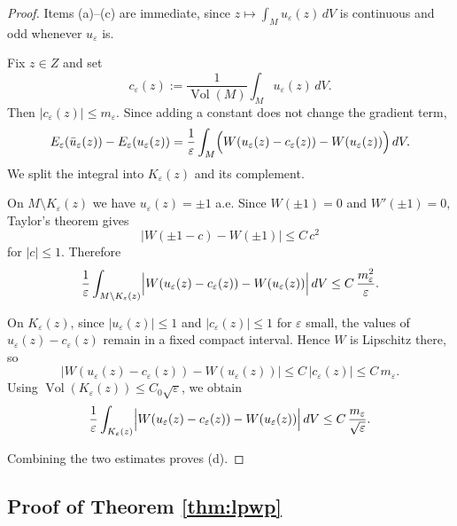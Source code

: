 \documentclass[12pt,english]{article}
\theoremstyle{definition}
\begin{document}
\begin{proof}
Items (a)--(c) are immediate, since $z\mapsto \int_M u_\varepsilon(z)\,dV$
is continuous and odd whenever $u_\varepsilon$ is.

Fix $z\in Z$ and set
\[
c_\varepsilon(z):=\frac{1}{\operatorname{Vol}(M)}\int_M u_\varepsilon(z)\,dV.
\]
Then $|c_\varepsilon(z)|\le m_\varepsilon.$ Since adding a constant does not change the gradient term,
\[
E_\varepsilon(\bar u_\varepsilon(z))-E_\varepsilon(u_\varepsilon(z))
=
\frac1\varepsilon\int_M
\Bigl(W(u_\varepsilon(z)-c_\varepsilon(z))-W(u_\varepsilon(z))\Bigr)\,dV.
\]
We split the integral into $K_\varepsilon(z)$ and its complement.

On $M\setminus K_\varepsilon(z)$ we have $u_\varepsilon(z)=\pm1$ a.e. Since $ W(\pm1)=0$ and $W'(\pm1)=0$, Taylor's theorem gives
\[
|W(\pm1-c)-W(\pm1)|\le C\,c^2
\]
for $|c|\le 1$. Therefore
\[
\frac1\varepsilon\int_{M\setminus K_\varepsilon(z)}
\Bigl|W(u_\varepsilon(z)-c_\varepsilon(z))-W(u_\varepsilon(z))\Bigr|\,dV
\le C\,\frac{m_\varepsilon^2}{\varepsilon}.
\]

On $K_\varepsilon(z)$, since $|u_\varepsilon(z)|\le 1$ and $|c_\varepsilon(z)|\le 1$ for $\varepsilon$ small,
the values of $u_\varepsilon(z)-c_\varepsilon(z)$ remain in a fixed compact interval. Hence $W$ is
Lipschitz there, so
\[
|W(u_\varepsilon(z)-c_\varepsilon(z))-W(u_\varepsilon(z))|
\le C\,|c_\varepsilon(z)|
\le C\,m_\varepsilon.
\]
Using $\operatorname{Vol}(K_\varepsilon(z))\le C_0\sqrt{\varepsilon}$, we obtain
\[
\frac1\varepsilon\int_{K_\varepsilon(z)}
\Bigl|W(u_\varepsilon(z)-c_\varepsilon(z))-W(u_\varepsilon(z))\Bigr|\,dV
\le C\,\frac{m_\varepsilon}{\sqrt{\varepsilon}}.
\]

Combining the two estimates proves (d).
\end{proof}

\subsection{Proof of Theorem \ref{thm:lpwp}}
\end{document}
